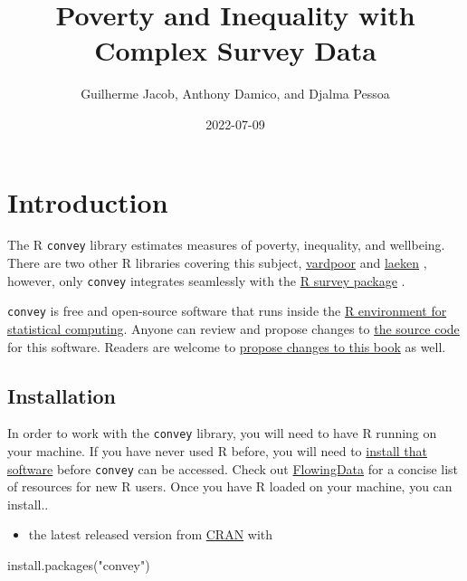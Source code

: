 \documentclass[
]{book}
\title{Poverty and Inequality with Complex Survey Data}
\author{Guilherme Jacob, Anthony Damico, and Djalma Pessoa}
\date{2022-07-09}
\newenvironment{Shaded}{\begin{snugshade}}{\end{snugshade}}
\newcommand{\FunctionTok}[1]{\textcolor[rgb]{0.00,0.00,0.00}{#1}}
\newcommand{\NormalTok}[1]{#1}
\newcommand{\StringTok}[1]{\textcolor[rgb]{0.31,0.60,0.02}{#1}}
\providecommand{\tightlist}{%
  \setlength{\itemsep}{0pt}\setlength{\parskip}{0pt}}
\begin{document}
\maketitle

{
\setcounter{tocdepth}{1}
\tableofcontents
}
\hypertarget{introduction}{%
\chapter{Introduction}\label{introduction}}

The R \texttt{convey} library estimates measures of poverty, inequality, and wellbeing. There are two other R libraries covering this subject, \href{https://CRAN.R-project.org/package=vardpoor}{vardpoor} \autocite{R-vardpoor} and \href{https://CRAN.R-project.org/package=laeken}{laeken} \autocite{R-laeken}, however, only \texttt{convey} integrates seamlessly with the \href{https://CRAN.R-project.org/package=survey}{R survey package} \autocite{R-survey-article,R-survey-book,R-survey}.

\texttt{convey} is free and open-source software that runs inside the \href{https://www.r-project.org/}{R environment for statistical computing}. Anyone can review and propose changes to \href{https://github.com/DjalmaPessoa/convey}{the source code} for this software. Readers are welcome to \href{https://github.com/guilhermejacob/context/}{propose changes to this book} as well.

\hypertarget{install}{%
\section{Installation}\label{install}}

In order to work with the \texttt{convey} library, you will need to have R running on your machine. If you have never used R before, you will need to \href{https://www.r-project.org/}{install that software} before \texttt{convey} can be accessed. Check out \href{http://flowingdata.com/2012/06/04/resources-for-getting-started-with-r/}{FlowingData} for a concise list of resources for new R users. Once you have R loaded on your machine, you can install..

\begin{itemize}
\tightlist
\item
  the latest released version from \href{https://CRAN.R-project.org/package=convey}{CRAN} with
\end{itemize}

\begin{Shaded}
\begin{Highlighting}[]
\FunctionTok{install.packages}\NormalTok{(}\StringTok{"convey"}\NormalTok{)}
\end{Highlighting}
\end{Shaded}
\end{document}
